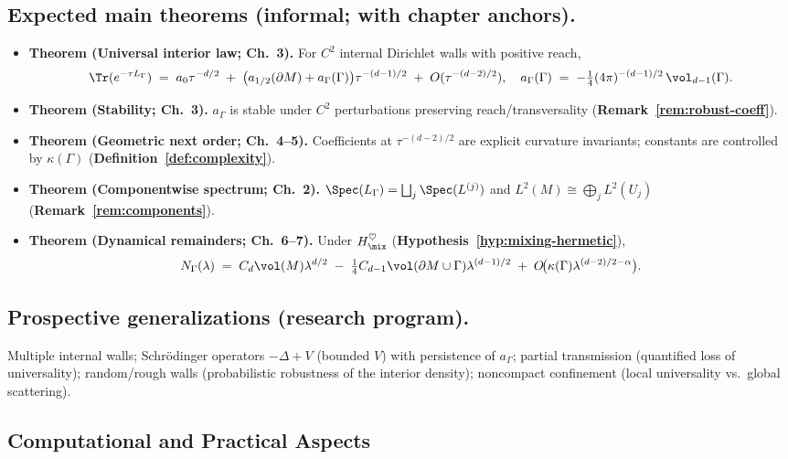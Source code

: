 \subsection{Expected main theorems (informal; with chapter anchors).}\label{subsec:expected}
\begin{itemize}
  \item \textbf{Theorem (Universal interior law; Ch.~3).}
  For $C^2$ internal Dirichlet walls with positive reach,
  \[
  \Tr(e^{-\tau L_\Gamma}) \;=\; a_0\tau^{-d/2} \;+\; \big(a_{1/2}(\partial M)+a_\Gamma(\Gamma)\big)\tau^{-(d-1)/2} \;+\; O(\tau^{-(d-2)/2}),
  \quad
  a_\Gamma(\Gamma) \;=\; -\tfrac14(4\pi)^{-(d-1)/2}\,\vol_{d-1}(\Gamma).
  \]
  \item \textbf{Theorem (Stability; Ch.~3).}
  $a_\Gamma$ is stable under $C^2$ perturbations preserving reach/transversality (\textbf{Remark~\ref{rem:robust-coeff}}).
  \item \textbf{Theorem (Geometric next order; Ch.~4–5).}
  Coefficients at $\tau^{-(d-2)/2}$ are explicit curvature invariants; constants are controlled by $\kappa(\Gamma)$ (\textbf{Definition~\ref{def:complexity}}).
  \item \textbf{Theorem (Componentwise spectrum; Ch.~2).}
  $\Spec(L_\Gamma)=\bigsqcup_j \Spec(L^{(j)})$ and $L^2(M)\cong\bigoplus_j L^2(U_j)$ (\textbf{Remark~\ref{rem:components}}).
  \item \textbf{Theorem (Dynamical remainders; Ch.~6–7).}
  Under $H_{\mix}^{\heartsuit}$ (\textbf{Hypothesis~\ref{hyp:mixing-hermetic}}),
  \[
  N_\Gamma(\lambda) \;=\; C_d\vol(M)\lambda^{d/2} \;-\; \tfrac14 C_{d-1}\vol(\partial M\cup\Gamma)\lambda^{(d-1)/2}
  \;+\; O\!\big(\kappa(\Gamma)\lambda^{(d-2)/2-\alpha}\big).
  \]
\end{itemize}

\subsection{Prospective generalizations (research program).}\label{subsec:generalizations}
Multiple internal walls; Schr\"odinger operators $-\Delta+V$ (bounded $V$) with persistence of $a_\Gamma$; partial transmission (quantified loss of universality); random/rough walls (probabilistic robustness of the interior density); noncompact confinement (local universality vs.\ global scattering).

\subsection{Computational and Practical Aspects}\label{sec:computational}
